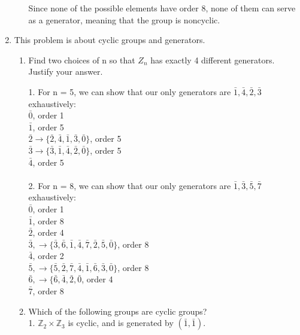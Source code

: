 \begin{enumerate}
\begin{enumerate}
Since none of the possible elements have order 8, none of them can serve as a generator, meaning that the group is noncyclic.

\end{enumerate}

\item This problem is about cyclic groups and generators.

\begin{enumerate}
\item Find two choices of n so that $Z_n$ has exactly 4 different generators. Justify your answer.

1. For n = 5, we can show that our only generators are $\bar{1}, \bar{4}, \bar{2}, \bar{3}$ exhaustively:\\

$\bar{0}$, order 1\\
$\bar{1}$, order 5\\
$\bar{2} \rightarrow \{\bar{2}, \bar{4}, \bar{1}, \bar{3}, \bar{0}\}$, order 5\\
$\bar{3} \rightarrow \{\bar{3}, \bar{1}, \bar{4}, \bar{2}, \bar{0}\}$, order 5\\
$\bar{4}$, order 5\\\\

2. For n = 8, we can show that our only generators are $\bar{1}, \bar{3}, \bar{5}, \bar{7}$ exhaustively:\\

$\bar{0}$, order 1\\
$\bar{1}$, order 8\\
$\bar{2}$, order 4\\
$\bar{3}, \rightarrow \{\bar{3}, \bar{6}, \bar{1}, \bar{4}, \bar{7}, \bar{2}, \bar{5}, \bar{0}\}$, order 8\\
$\bar{4}$, order 2\\
$\bar{5}, \rightarrow \{\bar{5}, \bar{2}, \bar{7}, \bar{4}, \bar{1}, \bar{6}, \bar{3}, \bar{0}\}$, order 8\\
$\bar{6}, \rightarrow \{\bar{6}, \bar{4}, \bar{2}, \bar{0}$, order 4\\
$\bar{7}$, order 8\\

\item Which of the following groups are cyclic groups?\\

1. $\mathds{Z}_2 \times \mathds{Z}_3$ is cyclic, and is generated by $(\bar{1},\bar{1})$.\\


\end{enumerate}
\end{enumerate}
